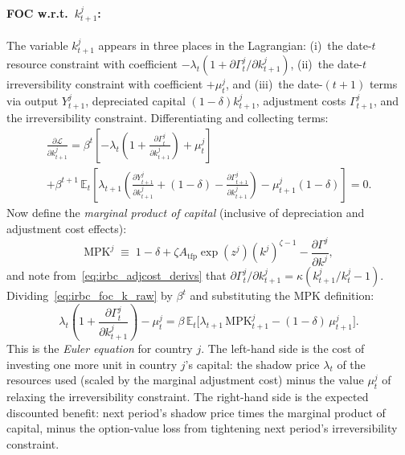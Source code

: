 \documentclass[11pt,a4paper]{report}
\begin{document}
\paragraph{FOC w.r.t.\ $k_{t+1}^j$:}  The variable $k_{t+1}^j$ appears in three places in the Lagrangian: (i)~the date-$t$ resource constraint with coefficient $-\lambda_t(1 + \partial\Gamma_t^j/\partial k_{t+1}^j)$, (ii)~the date-$t$ irreversibility constraint with coefficient $+\mu_t^j$, and (iii)~the date-$(t\!+\!1)$ terms via output $Y_{t+1}^j$, depreciated capital $(1-\delta)k_{t+1}^j$, adjustment costs $\Gamma_{t+1}^j$, and the irreversibility constraint.  Differentiating and collecting terms:
\begin{multline}
\frac{\partial \mathcal{L}}{\partial k_{t+1}^j}
= \beta^t \!\left[-\lambda_t\!\left(1 + \frac{\partial \Gamma_t^j}{\partial k_{t+1}^j}\right) + \mu_t^j\right] \\
+ \beta^{t+1}\,\mathbb{E}_t\!\left[\lambda_{t+1}\!\left(\frac{\partial Y_{t+1}^j}{\partial k_{t+1}^j} + (1-\delta) - \frac{\partial \Gamma_{t+1}^j}{\partial k_{t+1}^j}\right) - \mu_{t+1}^j(1-\delta)\right] = 0.
\label{eq:irbc_foc_k_raw}
\end{multline}
Now define the \emph{marginal product of capital} (inclusive of depreciation and adjustment cost effects):
\begin{equation}
\mathrm{MPK}^j \;\equiv\; 1-\delta + \zeta A_\mathrm{tfp}\exp(z^j)(k^j)^{\zeta-1} - \frac{\partial \Gamma^j}{\partial k^j},
\label{eq:irbc_mpk}
\end{equation}
and note from~\eqref{eq:irbc_adjcost_derivs} that $\partial \Gamma_t^j / \partial k_{t+1}^j = \kappa(k_{t+1}^j/k_t^j - 1)$.  Dividing~\eqref{eq:irbc_foc_k_raw} by $\beta^t$ and substituting the MPK definition:
\begin{equation}
\lambda_t\!\left(1 + \frac{\partial \Gamma_t^j}{\partial k_{t+1}^j}\right) - \mu_t^j
= \beta\,\mathbb{E}_t\!\bigl[\lambda_{t+1}\,\mathrm{MPK}_{t+1}^j - (1-\delta)\,\mu_{t+1}^j\bigr].
\label{eq:irbc_euler_level}
\end{equation}
This is the \emph{Euler equation} for country $j$.  The left-hand side is the cost of investing one more unit in country $j$'s capital: the shadow price $\lambda_t$ of the resources used (scaled by the marginal adjustment cost) minus the value $\mu_t^j$ of relaxing the irreversibility constraint.  The right-hand side is the expected discounted benefit: next period's shadow price times the marginal product of capital, minus the option-value loss from tightening next period's irreversibility constraint.
\end{document}
